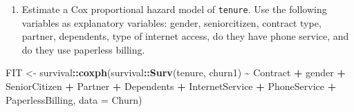 \documentclass[
]{article}
\newenvironment{Shaded}{\begin{snugshade}}{\end{snugshade}}
\newcommand{\AttributeTok}[1]{\textcolor[rgb]{0.13,0.29,0.53}{#1}}
\newcommand{\FunctionTok}[1]{\textcolor[rgb]{0.13,0.29,0.53}{\textbf{#1}}}
\newcommand{\NormalTok}[1]{#1}
\newcommand{\OtherTok}[1]{\textcolor[rgb]{0.56,0.35,0.01}{#1}}
\newcommand{\SpecialCharTok}[1]{\textcolor[rgb]{0.81,0.36,0.00}{\textbf{#1}}}
\providecommand{\tightlist}{%
  \setlength{\itemsep}{0pt}\setlength{\parskip}{0pt}}
\begin{document}
\begin{enumerate}
\def\labelenumi{\arabic{enumi})}
\setcounter{enumi}{5}
\tightlist
\item
  Estimate a Cox proportional hazard model of \texttt{tenure}. Use the
  following variables as explanatory variables: gender, seniorcitizen,
  contract type, partner, dependents, type of internet access, do they
  have phone service, and do they use paperless billing.
\end{enumerate}

\begin{Shaded}
\begin{Highlighting}[]
\NormalTok{FIT }\OtherTok{\textless{}{-}}\NormalTok{ survival}\SpecialCharTok{::}\FunctionTok{coxph}\NormalTok{(survival}\SpecialCharTok{::}\FunctionTok{Surv}\NormalTok{(tenure, churn1) }\SpecialCharTok{\textasciitilde{}}\NormalTok{ Contract }\SpecialCharTok{+}\NormalTok{ gender }\SpecialCharTok{+}\NormalTok{ SeniorCitizen }\SpecialCharTok{+}\NormalTok{ Partner }\SpecialCharTok{+}\NormalTok{ Dependents }\SpecialCharTok{+}\NormalTok{ InternetService }\SpecialCharTok{+}\NormalTok{ PhoneService }\SpecialCharTok{+}\NormalTok{ PaperlessBilling, }\AttributeTok{data =}\NormalTok{ Churn)}


\end{Highlighting}
\end{Shaded}
\end{document}
